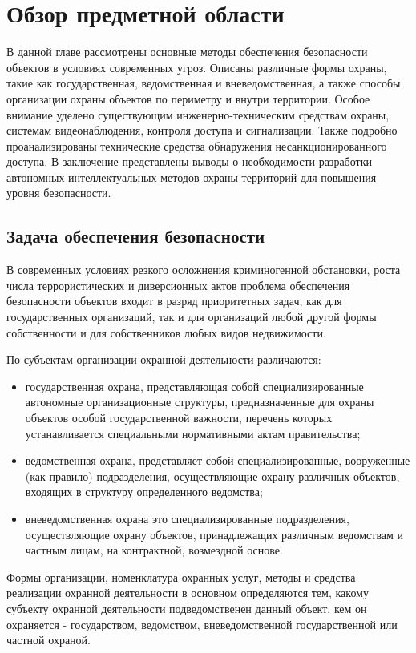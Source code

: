 \chapter{Обзор предметной области} \label{ch1}

В данной главе рассмотрены основные методы обеспечения безопасности объектов в условиях современных угроз. Описаны различные формы охраны, такие как государственная, ведомственная и вневедомственная, а также способы организации охраны объектов по периметру и внутри территории. Особое внимание уделено существующим инженерно-техническим средствам охраны, системам видеонаблюдения, контроля доступа и сигнализации. Также подробно проанализированы технические средства обнаружения несанкционированного доступа. В заключение представлены выводы о необходимости разработки автономных интеллектуальных методов охраны территорий для повышения уровня безопасности.


\section{Задача обеспечения безопасности} \label{ch1:sec1}

В современных условиях резкого осложнения криминогенной обстановки, роста числа террористических и диверсионных актов проблема обеспечения безопасности объектов входит в разряд приоритетных задач, как для государственных организаций, так и для организаций любой другой формы собственности и для собственников любых видов недвижимости.

По субъектам организации охранной деятельности различаются:
\begin{itemize}
    \item государственная охрана, представляющая собой специализированные автономные организационные структуры, предназначенные для охраны объектов особой государственной важности, перечень которых устанавливается специальными нормативными актам правительства;
    \item ведомственная охрана, представляет собой специализированные, вооруженные (как правило) подразделения, осуществляющие охрану различных объектов, входящих в структуру определенного ведомства;
    \item вневедомственная охрана это специализированные подразделения, осуществляющие охрану объектов, принадлежащих различным ведомствам и частным лицам, на контрактной, возмездной основе.
\end{itemize}

Формы организации, номенклатура охранных услуг, методы и средства реализации охранной деятельности в основном определяются тем, какому субъекту охранной деятельности подведомственен данный объект, кем он охраняется - государством, ведомством, вневедомственной государственной или частной охраной.

